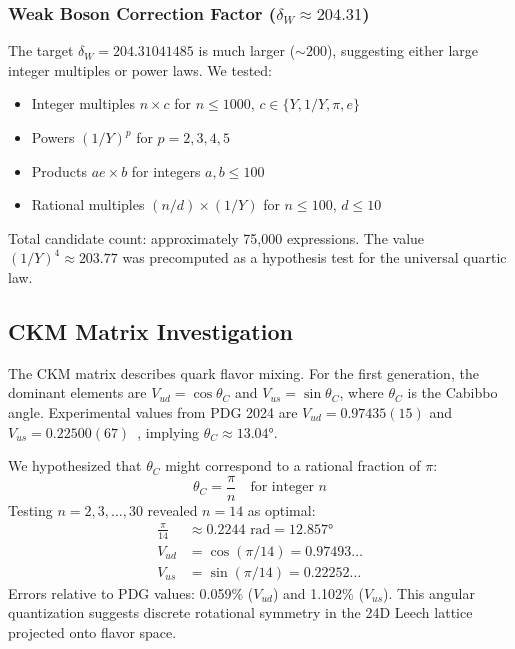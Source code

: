 \documentclass[11pt,a4paper]{article}
\begin{document}
\subsubsection{Weak Boson Correction Factor ($\delta_W \approx 204.31$)}

The target $\delta_W = 204.31041485$ is much larger ($\sim 200$), suggesting either large integer multiples or power laws. We tested:
\begin{itemize}
\item Integer multiples $n \times c$ for $n \le 1000$, $c \in \{Y, 1/Y, \pi, e\}$
\item Powers $(1/Y)^p$ for $p = 2, 3, 4, 5$
\item Products $a e \times b$ for integers $a, b \le 100$
\item Rational multiples $(n/d) \times (1/Y)$ for $n \le 100$, $d \le 10$
\end{itemize}
Total candidate count: approximately 75,000 expressions. The value $(1/Y)^4 \approx 203.77$ was precomputed as a hypothesis test for the universal quartic law.

\subsection{CKM Matrix Investigation}

The CKM matrix describes quark flavor mixing. For the first generation, the dominant elements are $V_{ud} = \cos \theta_C$ and $V_{us} = \sin \theta_C$, where $\theta_C$ is the Cabibbo angle. Experimental values from PDG 2024 are $V_{ud} = 0.97435(15)$ and $V_{us} = 0.22500(67)$~\cite{ref007}, implying $\theta_C \approx 13.04°$.

We hypothesized that $\theta_C$ might correspond to a rational fraction of $\pi$:
\begin{equation}
\theta_C = \frac{\pi}{n} \quad \text{for integer } n
\end{equation}
Testing $n = 2, 3, \ldots, 30$ revealed $n=14$ as optimal:
\begin{align}
\frac{\pi}{14} &\approx 0.2244 \text{ rad} = 12.857° \\
V_{ud} &= \cos(\pi/14) = 0.97493\ldots \\
V_{us} &= \sin(\pi/14) = 0.22252\ldots
\end{align}
Errors relative to PDG values: 0.059\% ($V_{ud}$) and 1.102\% ($V_{us}$). This angular quantization suggests discrete rotational symmetry in the 24D Leech lattice projected onto flavor space.
\end{document}

